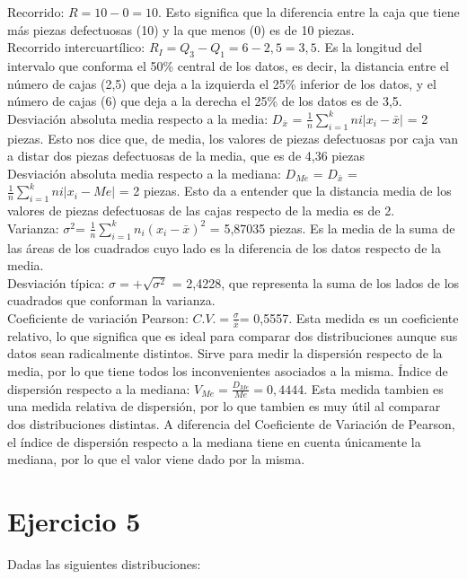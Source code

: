 \documentclass[a4paper,12pt]{article}
\begin{document}
Recorrido: $R=10 - 0 = 10$. Esto significa que la diferencia entre la caja que tiene más piezas defectuosas (10) y la que menos (0) es de 10 piezas.\\
Recorrido intercuartílico: $R_I = Q_3 - Q_1 = 6-2,5 = 3,5$. Es la longitud del intervalo que conforma el 50\% central de los datos, es decir, la distancia entre el número de cajas (2,5) que deja a la izquierda el 25\% inferior de los datos, y el número de cajas (6) que deja a la derecha el 25\% de los datos es de 3,5.\\
Desviación absoluta media respecto a la media: $D_\bar x$ = $\frac{1}{n}\sum\limits_{i = 1}^k ni|x_i - \bar x|$ = 2 piezas. Esto nos dice que, de media, los valores de piezas defectuosas por caja van a distar dos piezas defectuosas de la media, que es de 4,36 piezas\\
Desviación absoluta media respecto a la mediana: $D_{Me}$ = $D_\bar x$ = $\frac{1}{n}\sum\limits_{i = 1}^k ni|x_i - Me|$ = 2 piezas. Esto da a entender que la distancia media de los valores de piezas defectuosas de las cajas respecto de la media es de 2.\\
Varianza: $\sigma^2$= $\frac{1}{n}\sum\limits_{i=1}^kn_i(x_i-\bar x)^2$ = 5,87035 piezas. Es la media de la suma de las áreas de los cuadrados cuyo lado es la diferencia de los datos respecto de la media.\\
Desviación típica: $\sigma=+\sqrt{\sigma^2}$ = 2,4228, que representa la suma de los lados de los cuadrados que conforman la varianza.\\
Coeficiente de variación Pearson: $C.V.=\frac{\sigma}{\bar x}$= 0,5557. Esta medida es un coeficiente relativo, lo que significa que es ideal para comparar dos distribuciones aunque sus datos sean radicalmente distintos. Sirve para medir la dispersión respecto de la media, por lo que tiene todos los inconvenientes asociados a la misma.
Índice de dispersión respecto a la mediana: $V_{Me}= \frac{D_{Me}}{Me}=0,4444$. Esta medida tambien es una medida relativa de dispersión, por lo que tambien es muy útil al comparar dos distribuciones distintas. A diferencia del Coeficiente de Variación de Pearson, el índice de dispersión respecto a la mediana tiene en cuenta únicamente la mediana, por lo que el valor viene dado por la misma. 




\section*{Ejercicio 5}
Dadas las siguientes distribuciones:
\end{document}
